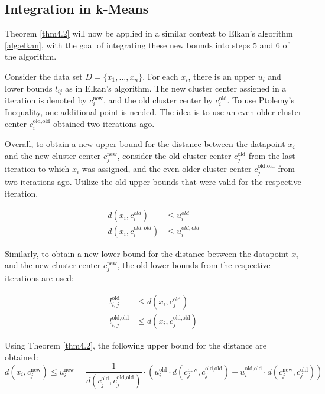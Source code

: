 \subsection{Integration in k-Means}
Theorem \ref{thm4.2} will now be applied in a similar context to Elkan's algorithm \ref{alg:elkan}, with the goal of integrating these new bounds into steps 5 and 6 of the algorithm.

Consider the data set \(D = \{x_1, \ldots, x_n\}\). For each \(x_i\), there is an upper \(u_i\) and lower bounds \(l_{ij}\) as in Elkan's algorithm. The new cluster center assigned in a iteration is denoted by \(c_i^{\text{new}}\), and the old cluster center by \(c_i^{\text{old}}\). To use Ptolemy's Inequality, one additional point is needed. The idea is to use an even older cluster center \(c_i^{\text{old,old}}\) obtained two iterations ago.

Overall, to obtain a new upper bound for the distance between the datapoint \(x_i\) and the new cluster center \(c_j^{\text{new}}\), consider the old cluster center \(c_j^{\text{old}}\) from the last iteration to which \(x_i\) was assigned, and the even older cluster center \(c_j^{\text{old,old}}\) from two iterations ago. Utilize the old upper bounds that were valid for the respective iteration.

\begin{equation*}
	\begin{aligned}
		d(x_i,c_i^{old})      & \leq u_i^{old}      \\
		d(x_i,c_i^{old, old}) & \leq u_i^{old, old}
	\end{aligned}
\end{equation*}

Similarly, to obtain a new lower bound for the distance between the datapoint \(x_i\) and the new cluster center \(c_j^{\text{new}}\), the old lower bounds from the respective iterations are used:

\begin{equation*}
	\begin{aligned}
		l_{i,j}^{\text{old}}     & \leq d(x_i, c_j^{\text{old}})     \\
		l_{i,j}^{\text{old,old}} & \leq d(x_i, c_j^{\text{old,old}})
	\end{aligned}
\end{equation*}

Using Theorem \ref{thm4.2}, the following upper bound for the distance are obtained:
\begin{equation}
	\label{eq4.7}
	d(x_i, c_j^{\text{new}}) \leq u_i^{\text{new}} = \frac{1}{d(c_j^{\text{old}}, c_j^{\text{old,old}})} \cdot \left( u_i^{\text{old}} \cdot d(c_j^{\text{new}}, c_j^{\text{old,old}}) + u_i^{\text{old,old}} \cdot d(c_j^{\text{new}}, c_j^{\text{old}}) \right)
\end{equation}

